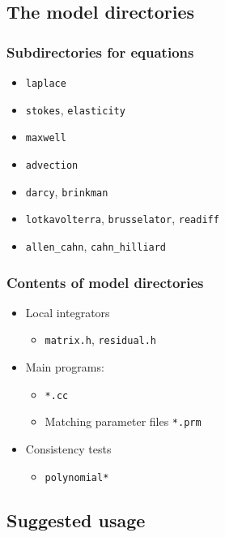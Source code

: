 \subsection[Models]{The model directories}
\frame{\tableofcontents[currentsection,subsectionstyle=show/shaded/hide]}

\begin{frame}
  \frametitle{Subdirectories for equations}
  \begin{itemize}
  \item \lstinline!laplace!
  \item \lstinline!stokes!, \lstinline!elasticity!
  \item \lstinline!maxwell!
  \item \lstinline!advection!
  \item \lstinline!darcy!, \lstinline!brinkman!
  \item \lstinline!lotkavolterra!, \lstinline!brusselator!, \lstinline!readiff!
  \item \lstinline!allen_cahn!, \lstinline!cahn_hilliard!
  \end{itemize}
\end{frame}

\begin{frame}
  \frametitle{Contents of model directories}
  \begin{itemize}
  \item Local integrators
    \begin{itemize}
    \item \lstinline!matrix.h!, \lstinline!residual.h!
    \end{itemize}
  \item Main programs:
    \begin{itemize}
    \item \lstinline!*.cc!
    \item Matching parameter files \lstinline!*.prm!
    \end{itemize}
  \item Consistency tests
    \begin{itemize}
    \item \lstinline!polynomial*!
    \end{itemize}
  \end{itemize}
\end{frame}

\subsection[Usage]{Suggested usage}
\frame{\tableofcontents[currentsection,subsectionstyle=show/shaded/hide]}

